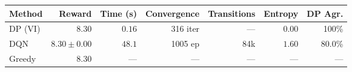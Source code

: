 \begin{tabular}{lrrrrrr}
\toprule
Method & Reward & Time (s) & Convergence & Transitions & Entropy & DP Agr. \\
\midrule
DP (VI) & $8.30$ & $0.16$ & 316 iter & --- & $0.00$ & 100\% \\
DQN & $8.30 \pm 0.00$ & $48.1$ & 1005 ep & 84k & $1.60$ & 80.0\% \\
Greedy & $8.30$ & --- & --- & --- & --- & --- \\
\bottomrule
\end{tabular}

